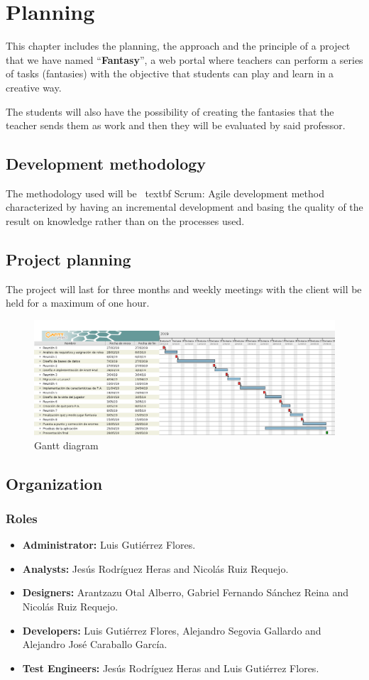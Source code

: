\chapter{Planning}
This chapter includes the planning, the approach and the principle of a project that we have named ``\textbf{Fantasy}'', a web portal where teachers can perform a series of tasks (fantasies) with the objective that students can play and learn in a creative way.

The students will also have the possibility of creating the fantasies that the teacher sends them as work and then they will be evaluated by said professor.

\section{Development methodology}
The methodology used will be \ textbf {Scrum}: Agile development method characterized by having an incremental development and basing the quality of the result on knowledge rather than on the processes used.

\section{Project planning}
The project will last for three months and weekly meetings with the client will be held for a maximum of one hour.
\newpage
\begin{figure}[h]
	\centering
	\includegraphics[scale=0.35]{Fantasy.png}
	\caption{Gantt diagram}
	\label{Gantt diagram}
\end{figure}

\section{Organization}
\subsection{Roles}
\begin{itemize}
	\item \textbf{Administrator:} Luis Gutiérrez Flores.
	\item \textbf{Analysts:} Jesús Rodríguez Heras and Nicolás Ruiz Requejo.
	\item \textbf{Designers:} Arantzazu Otal Alberro, Gabriel Fernando Sánchez Reina and Nicolás Ruiz Requejo.
	\item \textbf{Developers:} Luis Gutiérrez Flores, Alejandro Segovia Gallardo and Alejandro José Caraballo García.
	\item \textbf{Test Engineers:} Jesús Rodríguez Heras and Luis Gutiérrez Flores.
\end{itemize}

